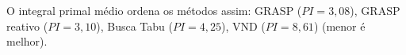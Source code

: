 O integral primal médio ordena os métodos assim: GRASP ($\mathit{PI}=3{,}08$), GRASP reativo ($\mathit{PI}=3{,}10$), Busca Tabu ($\mathit{PI}=4{,}25$), VND ($\mathit{PI}=8{,}61$) (menor é melhor).
